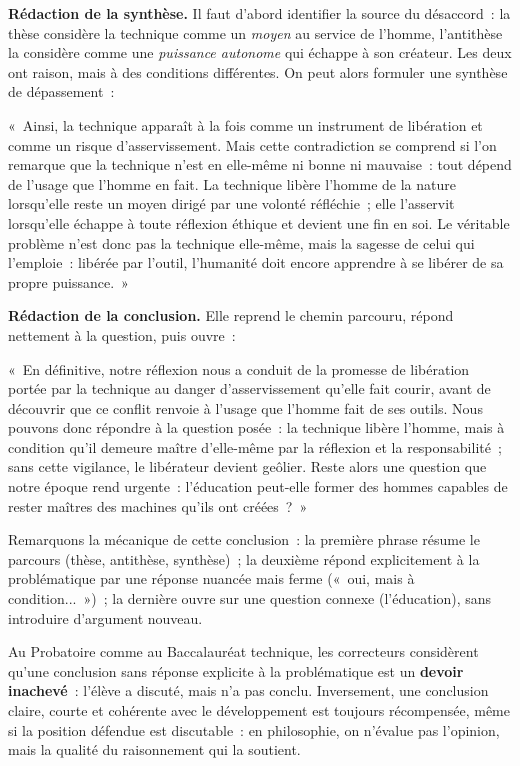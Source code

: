 \documentclass[11pt]{article}
\begin{document}
\textbf{Rédaction de la synthèse.} Il faut d'abord identifier la source du désaccord~: la thèse considère la technique comme un \emph{moyen} au service de l'homme, l'antithèse la considère comme une \emph{puissance autonome} qui échappe à son créateur. Les deux ont raison, mais à des conditions différentes. On peut alors formuler une synthèse de dépassement~:

\begin{exemplebox}
«~Ainsi, la technique apparaît à la fois comme un instrument de libération et comme un risque d'asservissement. Mais cette contradiction se comprend si l'on remarque que la technique n'est en elle-même ni bonne ni mauvaise~: tout dépend de l'usage que l'homme en fait. La technique libère l'homme de la nature lorsqu'elle reste un moyen dirigé par une volonté réfléchie~; elle l'asservit lorsqu'elle échappe à toute réflexion éthique et devient une fin en soi. Le véritable problème n'est donc pas la technique elle-même, mais la sagesse de celui qui l'emploie~: libérée par l'outil, l'humanité doit encore apprendre à se libérer de sa propre puissance.~»
\end{exemplebox}

\textbf{Rédaction de la conclusion.} Elle reprend le chemin parcouru, répond nettement à la question, puis ouvre~:

\begin{exemplebox}
«~En définitive, notre réflexion nous a conduit de la promesse de libération portée par la technique au danger d'asservissement qu'elle fait courir, avant de découvrir que ce conflit renvoie à l'usage que l'homme fait de ses outils. Nous pouvons donc répondre à la question posée~: la technique libère l'homme, mais à condition qu'il demeure maître d'elle-même par la réflexion et la responsabilité~; sans cette vigilance, le libérateur devient geôlier. Reste alors une question que notre époque rend urgente~: l'éducation peut-elle former des hommes capables de rester maîtres des machines qu'ils ont créées~?~»
\end{exemplebox}

Remarquons la mécanique de cette conclusion~: la première phrase résume le parcours (thèse, antithèse, synthèse)~; la deuxième répond explicitement à la problématique par une réponse nuancée mais ferme («~oui, mais à condition...~»)~; la dernière ouvre sur une question connexe (l'éducation), sans introduire d'argument nouveau.

\begin{savaistu}
Au Probatoire comme au Baccalauréat technique, les correcteurs considèrent qu'une conclusion sans réponse explicite à la problématique est un \textbf{devoir inachevé}~: l'élève a discuté, mais n'a pas conclu. Inversement, une conclusion claire, courte et cohérente avec le développement est toujours récompensée, même si la position défendue est discutable~: en philosophie, on n'évalue pas l'opinion, mais la qualité du raisonnement qui la soutient.
\end{savaistu}
\end{document}
